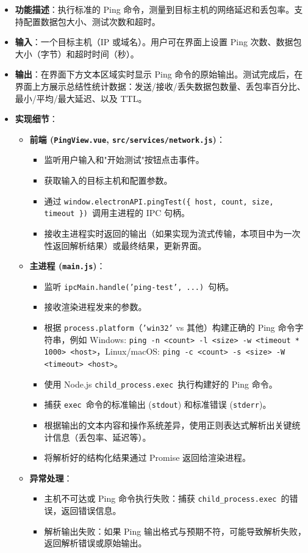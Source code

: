\documentclass{article}
\begin{document}
\begin{itemize}
    \item \textbf{功能描述}：执行标准的 Ping 命令，测量到目标主机的网络延迟和丢包率。支持配置数据包大小、测试次数和超时。
    \item \textbf{输入}：一个目标主机（IP 或域名）。用户可在界面上设置 Ping 次数、数据包大小（字节）和超时时间（秒）。
    \item \textbf{输出}：在界面下方文本区域实时显示 Ping 命令的原始输出。测试完成后，在界面上方展示总结性统计数据：发送/接收/丢失数据包数量、丢包率百分比、最小/平均/最大延迟、以及 TTL。
    \item \textbf{实现细节}：
    \begin{itemize}
        \item \textbf{前端 (\texttt{PingView.vue}, \texttt{src/services/network.js})}：
        \begin{itemize}
            \item 监听用户输入和"开始测试"按钮点击事件。
            \item 获取输入的目标主机和配置参数。
            \item 通过 \texttt{window.electronAPI.pingTest(\{ host, count, size, timeout \})}\ 调用主进程的 IPC 句柄。
            \item 接收主进程实时返回的输出（如果实现为流式传输，本项目中为一次性返回解析结果）或最终结果，更新界面。
        \end{itemize}
        \item \textbf{主进程 (\texttt{main.js})}：
        \begin{itemize}
            \item 监听 \texttt{ipcMain.handle('ping-test', ...)}\ 句柄。
            \item 接收渲染进程发来的参数。
            \item 根据 \texttt{process.platform}（\texttt{'win32'} vs 其他）构建正确的 Ping 命令字符串，例如 Windows: \texttt{ping -n <count> -l <size> -w <timeout * 1000> <host>}，Linux/macOS: \texttt{ping -c <count> -s <size> -W <timeout> <host>}。
            \item 使用 Node.js \texttt{child\_process.exec}\ 执行构建好的 Ping 命令。
            \item 捕获 \texttt{exec}\ 命令的标准输出 (\texttt{stdout}) 和标准错误 (\texttt{stderr})。
            \item 根据输出的文本内容和操作系统差异，使用正则表达式解析出关键统计信息（丢包率、延迟等）。
            \item 将解析好的结构化结果通过 Promise 返回给渲染进程。
        \end{itemize}
        \item \textbf{异常处理}：
        \begin{itemize}
            \item 主机不可达或 Ping 命令执行失败：捕获 \texttt{child\_process.exec}\ 的错误，返回错误信息。
            \item 解析输出失败：如果 Ping 输出格式与预期不符，可能导致解析失败，返回解析错误或原始输出。
        \end{itemize}
    \end{itemize}
\end{itemize}
\end{document}
